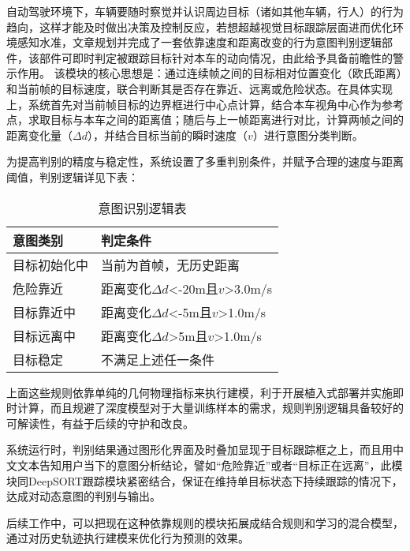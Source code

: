 自动驾驶环境下，车辆要随时察觉并认识周边目标（诸如其他车辆，行人）的行为趋向，这样才能及时做出决策及控制反应，若想超越视觉目标跟踪层面进而优化环境感知水准，文章规划并完成了一套依靠速度和距离改变的行为意图判别逻辑部件，该部件可即时判定被跟踪目标针对本车的动向情况，由此给予具备前瞻性的警示作用。
该模块的核心思想是：通过连续帧之间的目标相对位置变化（欧氏距离）和当前帧的目标速度，联合判断其是否存在靠近、远离或危险状态。在具体实现上，系统首先对当前帧目标的边界框进行中心点计算，结合本车视角中心作为参考点，求取目标与本车之间的距离值；随后与上一帧距离进行对比，计算两帧之间的距离变化量（$\Delta d$），并结合目标当前的瞬时速度（$v$）进行意图分类判断。

为提高判别的精度与稳定性，系统设置了多重判别条件，并赋予合理的速度与距离阈值，判别逻辑详见下表：

\begin{table}[htbp]
  \caption{意图识别逻辑表}
  \label{tab:timetable}
  \centering
  \begin{tabular}{ll}
    \toprule
    意图类别 & 判定条件 \\
    \midrule
    目标初始化中 & 当前为首帧，无历史距离 \\
    危险靠近 & 距离变化$\Delta d$<-20m且$v$>3.0m/s \\
    目标靠近中 & 距离变化$\Delta d$<-5m且$v$>1.0m/s \\
    目标远离中 & 距离变化$\Delta d$>5m且$v$>1.0m/s \\
    目标稳定 & 不满足上述任一条件 \\
    \bottomrule
  \end{tabular}
\end{table}

上面这些规则依靠单纯的几何物理指标来执行建模，利于开展植入式部署并实施即时计算，而且规避了深度模型对于大量训练样本的需求，规则判别逻辑具备较好的可解读性，有益于后续的守护和改良。

系统运行时，判别结果通过图形化界面及时叠加显现于目标跟踪框之上，而且用中文文本告知用户当下的意图分析结论，譬如“危险靠近”或者“目标正在远离”，此模块同DeepSORT跟踪模块紧密结合，保证在维持单目标状态下持续跟踪的情况下，达成对动态意图的判别与输出。

后续工作中，可以把现在这种依靠规则的模块拓展成结合规则和学习的混合模型，通过对历史轨迹执行建模来优化行为预测的效果。




\begin{tabular}{l l}
\end{tabular}
